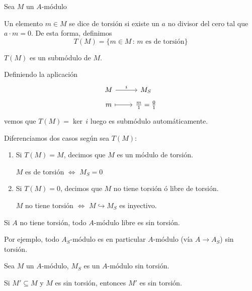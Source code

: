 Sea $M$ un $A$-m\'odulo
\begin{defi}
    Un elemento $m \in M$ se dice de torsi\'on si existe un $a$ no divisor del cero tal que $a\cdot m=0$. De esta forma, definimos 
    $$T(M) = \{m \in M \,  : \, m \text{ es de torsi\'on}\}$$
\end{defi}
\begin{prop}
    $T(M)$ es un subm\'odulo de $M$.
\end{prop}
\begin{dem}
    Definiendo la aplicaci\'on 
    $$\bt M \rar{i} & M_S\\[-5mm] m \rar[mapsto] & \frac{m}{1} = \frac{0}{1} \et$$
    vemos que $T(M) = \ker\, i$ luego es subm\'odulo autom\'aticamente.
\end{dem}
Diferenciamos dos casos seg\'un sea $T(M)$:
\begin{enumerate}
    \item Si $T(M) = M$, decimos que $M$ es un m\'odulo de torsi\'on.
    \begin{prop}
        $M$ es de torsi\'on $\iff$ $M_S=0$
    \end{prop}
    \item Si $T(M) = 0$, decimos que $M$ no tiene torsi\'on \'o libre de torsi\'on.
    \begin{prop}
        $M$ no tiene torsi\'on $\iff$ $M \hookrightarrow M_S$ es inyectivo. 
    \end{prop}
\end{enumerate}
Si $A$ no tiene torsi\'on, todo $A$-m\'odulo libre es sin torsi\'on. 

Por ejemplo, todo $A_S$-m\'odulo es en particular $A$-m\'odulo (v\'ia $A \longrightarrow A_S$) sin torsi\'on.

Sea $M$ un $A$-m\'odulo, $M_S$ es un $A$-m\'odulo sin torsi\'on. 

Si $M' \subseteq M$ y $M$ es sin torsi\'on, entonces $M'$ es sin torsi\'on.

